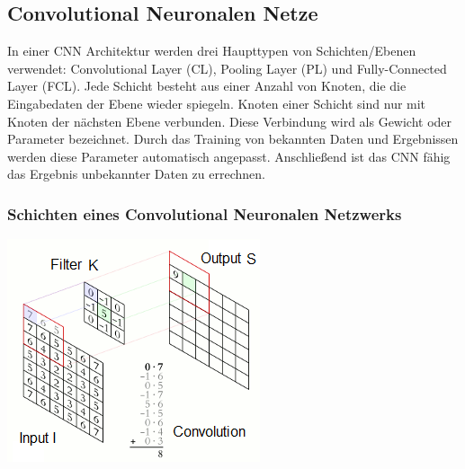 \documentclass[twosided,a4,10pt]{article}
\begin{document}
\begin{multicols}{2}
		\subsection{Convolutional Neuronalen Netze}
		In einer CNN Architektur werden drei Haupttypen von Schichten/Ebenen verwendet: Convolutional Layer (CL), Pooling Layer (PL) und Fully-Connected Layer (FCL). Jede Schicht besteht aus einer Anzahl von Knoten, die die Eingabedaten der Ebene wieder spiegeln. Knoten einer Schicht sind nur mit Knoten der nächsten Ebene verbunden. Diese Verbindung wird als Gewicht oder Parameter bezeichnet. Durch das Training von bekannten Daten und Ergebnissen werden diese Parameter automatisch angepasst. Anschließend ist das CNN fähig das Ergebnis unbekannter Daten zu errechnen.
		
		\subsubsection{Schichten eines Convolutional Neuronalen Netzwerks}
		
		\begin{minipage}{0.45\textwidth}
			\centering
			\includegraphics{img/faltung2.png}
			\label{img:faltung}
		\end{minipage}\newline
	

\end{multicols}
\end{document}
